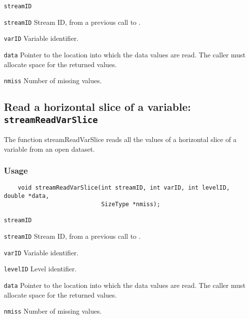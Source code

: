 \hspace*{4mm}\begin{minipage}[]{15cm}
\begin{deflist}{\texttt{streamID}\ }
\item[\texttt{streamID}]
Stream ID, from a previous call to {}.
\item[\texttt{varID}]
Variable identifier.
\item[\texttt{data}]
Pointer to the location into which the data values are read.
                     The caller must allocate space for the returned values.
\item[\texttt{nmiss}]
Number of missing values.

\end{deflist}
\end{minipage}


\subsection{Read a horizontal slice of a variable: \texttt{streamReadVarSlice}}
\label{streamReadVarSlice}

The function streamReadVarSlice reads all the values of a horizontal slice of a variable
from an open dataset.
\subsubsection*{Usage}

\begin{verbatim}
    void streamReadVarSlice(int streamID, int varID, int levelID, double *data, 
                            SizeType *nmiss);
\end{verbatim}

\hspace*{4mm}\begin{minipage}[]{15cm}
\begin{deflist}{\texttt{streamID}\ }
\item[\texttt{streamID}]
Stream ID, from a previous call to {}.
\item[\texttt{varID}]
Variable identifier.
\item[\texttt{levelID}]
Level identifier.
\item[\texttt{data}]
Pointer to the location into which the data values are read.
                     The caller must allocate space for the returned values.
\item[\texttt{nmiss}]
Number of missing values.

\end{deflist}
\end{minipage}



